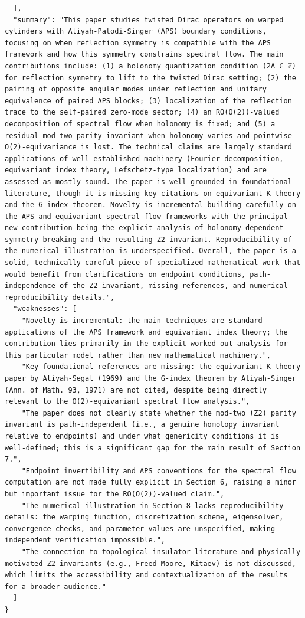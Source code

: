 \documentclass[11pt]{article}
\begin{document}
\begin{verbatim}
  ],
  "summary": "This paper studies twisted Dirac operators on warped cylinders with Atiyah-Patodi-Singer (APS) boundary conditions, focusing on when reflection symmetry is compatible with the APS framework and how this symmetry constrains spectral flow. The main contributions include: (1) a holonomy quantization condition (2A ∈ ℤ) for reflection symmetry to lift to the twisted Dirac setting; (2) the pairing of opposite angular modes under reflection and unitary equivalence of paired APS blocks; (3) localization of the reflection trace to the self-paired zero-mode sector; (4) an RO(O(2))-valued decomposition of spectral flow when holonomy is fixed; and (5) a residual mod-two parity invariant when holonomy varies and pointwise O(2)-equivariance is lost. The technical claims are largely standard applications of well-established machinery (Fourier decomposition, equivariant index theory, Lefschetz-type localization) and are assessed as mostly sound. The paper is well-grounded in foundational literature, though it is missing key citations on equivariant K-theory and the G-index theorem. Novelty is incremental—building carefully on the APS and equivariant spectral flow frameworks—with the principal new contribution being the explicit analysis of holonomy-dependent symmetry breaking and the resulting Z2 invariant. Reproducibility of the numerical illustration is underspecified. Overall, the paper is a solid, technically careful piece of specialized mathematical work that would benefit from clarifications on endpoint conditions, path-independence of the Z2 invariant, missing references, and numerical reproducibility details.",
  "weaknesses": [
    "Novelty is incremental: the main techniques are standard applications of the APS framework and equivariant index theory; the contribution lies primarily in the explicit worked-out analysis for this particular model rather than new mathematical machinery.",
    "Key foundational references are missing: the equivariant K-theory paper by Atiyah-Segal (1969) and the G-index theorem by Atiyah-Singer (Ann. of Math. 93, 1971) are not cited, despite being directly relevant to the O(2)-equivariant spectral flow analysis.",
    "The paper does not clearly state whether the mod-two (Z2) parity invariant is path-independent (i.e., a genuine homotopy invariant relative to endpoints) and under what genericity conditions it is well-defined; this is a significant gap for the main result of Section 7.",
    "Endpoint invertibility and APS conventions for the spectral flow computation are not made fully explicit in Section 6, raising a minor but important issue for the RO(O(2))-valued claim.",
    "The numerical illustration in Section 8 lacks reproducibility details: the warping function, discretization scheme, eigensolver, convergence checks, and parameter values are unspecified, making independent verification impossible.",
    "The connection to topological insulator literature and physically motivated Z2 invariants (e.g., Freed-Moore, Kitaev) is not discussed, which limits the accessibility and contextualization of the results for a broader audience."
  ]
}
\end{verbatim}
\end{document}
